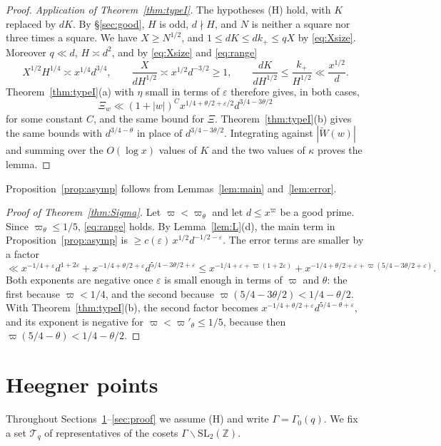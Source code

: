 \documentclass[11pt]{amsart}
\theoremstyle{remark}
\theoremstyle{definition}
\numberwithin{equation}{section}
\newcommand{\Tc}{\mathcal{T}}
\newcommand{\Z}{\mathbb{Z}}
\newcommand{\eps}{\varepsilon}
\newcommand{\SL}{\mathrm{SL}}
\begin{document}
\begin{proof}
\emph{Application of Theorem~\ref{thm:typeI}.} The hypotheses \textup{(H)} hold, with $K$ replaced by $dK$. By \S\ref{sec:good}, $H$ is odd, $d\nmid H$, and $N$ is neither a square nor three times a square. We have $X\ge N^{1/2}$, and $1\le dK\le dk_+\le qX$ by \eqref{eq:Xsize}. Moreover $q\ll d$, $H\asymp d^2$, and by \eqref{eq:Xsize} and \eqref{eq:range}
\[
X^{1/2}H^{1/4}\asymp x^{1/4}d^{3/4},\qquad\frac X{dH^{1/2}}\asymp x^{1/2}d^{-3/2}\ge1,\qquad\frac{dK}{dH^{1/2}}\le\frac{k_+}{H^{1/2}}\ll\frac{x^{1/2}}d.
\]
Theorem~\ref{thm:typeI}(a) with $\eta$ small in terms of $\eps$ therefore gives, in both cases,
\[
\Xi_w\ll(1+|w|)^{C}x^{1/4+\theta/2+\eps/2}d^{3/4-3\theta/2}
\]
for some constant $C$, and the same bound for $\Xi$. Theorem~\ref{thm:typeI}(b) gives the same bounds with $d^{3/4-\theta}$ in place of $d^{3/4-3\theta/2}$. Integrating against $|\widetilde W(w)|$ and summing over the $O(\log x)$ values of $K$ and the two values of $\kappa$ proves the lemma.
\end{proof}

Proposition~\ref{prop:asymp} follows from Lemmas~\ref{lem:main} and~\ref{lem:error}.

\begin{proof}[Proof of Theorem~\ref{thm:Sigma}]
Let $\varpi<\varpi_\theta$ and let $d\le x^{\varpi}$ be a good prime. Since $\varpi_\theta\le1/5$, \eqref{eq:range} holds. By Lemma~\ref{lem:L}(d), the main term in Proposition~\ref{prop:asymp} is $\ge c(\eps)\,x^{1/2}d^{-1/2-\eps}$. The error terms are smaller by a factor
\[
\ll x^{-1/4+\eps}d^{1+2\eps}+x^{-1/4+\theta/2+\eps}d^{5/4-3\theta/2+\eps}\le x^{-1/4+\eps+\varpi(1+2\eps)}+x^{-1/4+\theta/2+\eps+\varpi(5/4-3\theta/2+\eps)}.
\]
Both exponents are negative once $\eps$ is small enough in terms of $\varpi$ and $\theta$: the first because $\varpi<1/4$, and the second because $\varpi(5/4-3\theta/2)<1/4-\theta/2$. With Theorem~\ref{thm:typeI}(b), the second factor becomes $x^{-1/4+\theta/2+\eps}d^{5/4-\theta+\eps}$, and its exponent is negative for $\varpi<\varpi'_\theta\le1/5$, because then $\varpi(5/4-\theta)<1/4-\theta/2$.
\end{proof}

\section{Heegner points}\label{sec:heegner}

Throughout Sections~\ref{sec:heegner}--\ref{sec:proof} we assume \textup{(H)} and write $\Gamma=\Gamma_0(q)$. We fix a set $\Tc_q$ of representatives of the cosets $\Gamma\backslash\SL_2(\Z)$.
\end{document}
